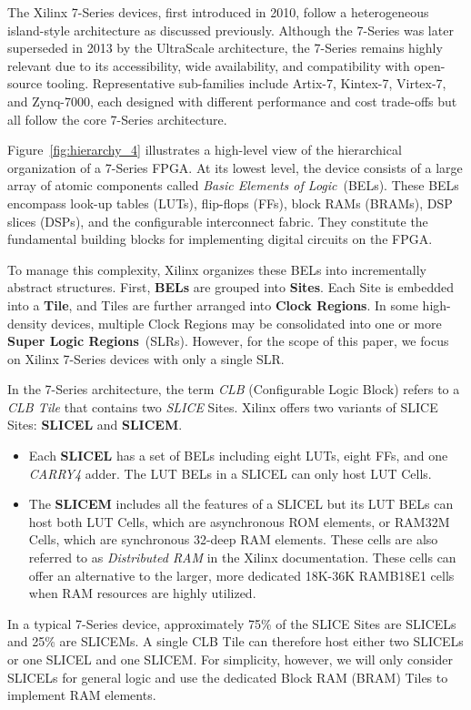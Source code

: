 \documentclass[twocolumn]{article}
\begin{document}
    The Xilinx 7-Series devices, first introduced in 2010, follow a heterogeneous island-style architecture as discussed previously. 
    Although the 7-Series was later superseded in 2013 by the UltraScale architecture, the 7-Series remains highly relevant due to its accessibility, wide availability, and compatibility with open-source tooling. 
    Representative sub-families include Artix-7, Kintex-7, Virtex-7, and Zynq-7000, each designed with different performance and cost trade-offs but all follow the core 7-Series architecture.

    Figure~\ref{fig:hierarchy_4} illustrates a high-level view of the hierarchical organization of a 7-Series FPGA. 
    At its lowest level, the device consists of a large array of atomic components called \emph{Basic Elements of Logic}~(BELs). 
    These BELs encompass look-up tables (LUTs), flip-flops (FFs), block RAMs (BRAMs), DSP slices (DSPs), and the configurable interconnect fabric. 
    They constitute the fundamental building blocks for implementing digital circuits on the FPGA.

    To manage this complexity, Xilinx organizes these BELs into incrementally abstract structures. 
    First, \textbf{BELs} are grouped into \textbf{Sites}. 
    Each Site is embedded into a \textbf{Tile}, and Tiles are further arranged into \textbf{Clock Regions}. 
    In some high-density devices, multiple Clock Regions may be consolidated into one or more \textbf{Super Logic Regions}~(SLRs). 
    However, for the scope of this paper, we focus on Xilinx 7-Series devices with only a single SLR.

    In the 7-Series architecture, the term \emph{CLB} (Configurable Logic Block) refers to a \emph{CLB Tile} that contains two \emph{SLICE} Sites. 
    Xilinx offers two variants of SLICE Sites: \textbf{SLICEL} and \textbf{SLICEM}.
    \begin{itemize}
        \item Each \textbf{SLICEL} has a set of BELs including eight LUTs, eight FFs, and one   \emph{CARRY4} adder. The LUT BELs in a SLICEL can only host LUT Cells. 
        \item The \textbf{SLICEM} includes all the features of a SLICEL but its LUT BELs can host both LUT Cells, which are asynchronous ROM elements, or RAM32M Cells, which are synchronous 32-deep RAM elements. These cells are also referred to as \emph{Distributed RAM} in the Xilinx documentation.
        These cells can offer an alternative to the larger, more dedicated 18K-36K RAMB18E1 cells when RAM resources are highly utilized. 
    \end{itemize}
    In a typical 7-Series device, approximately 75\% of the SLICE Sites are SLICELs and 25\% are SLICEMs. 
    A single CLB Tile can therefore host either two SLICELs or one SLICEL and one SLICEM.
    For simplicity, however, we will only consider SLICELs for general logic and use the dedicated Block RAM (BRAM) Tiles to implement RAM elements. 
\end{document}
